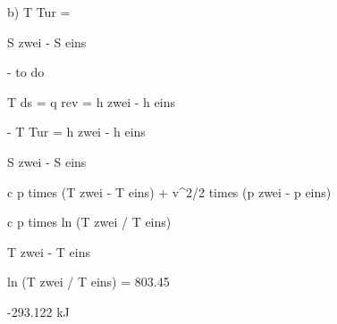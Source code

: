 b) T Tur =

S zwei - S eins

- to do

T ds = q rev = h zwei - h eins

- T Tur = h zwei - h eins

S zwei - S eins

c p times (T zwei - T eins) + v^2/2 times (p zwei - p eins)

c p times ln (T zwei / T eins)

T zwei - T eins

ln (T zwei / T eins) = 803.45

-293.122 kJ